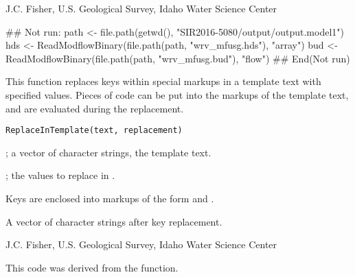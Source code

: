 \documentclass[a4paper]{book}
\begin{document}
%
\begin{Author}\relax
J.C. Fisher, U.S. Geological Survey, Idaho Water Science Center
\end{Author}
%
\begin{SeeAlso}\relax
{}
\end{SeeAlso}
%
\begin{Examples}
\begin{ExampleCode}
## Not run: 
path <- file.path(getwd(), "SIR2016-5080/output/output.model1")
hds <- ReadModflowBinary(file.path(path, "wrv_mfusg.hds"), "array")
bud <- ReadModflowBinary(file.path(path, "wrv_mfusg.bud"), "flow")
## End(Not run)
\end{ExampleCode}
\end{Examples}
%
\begin{Description}\relax
This function replaces keys within special markups in a template text with specified values.
Pieces of \R{} code can be put into the markups of the template text, and are evaluated during the replacement.
\end{Description}
%
\begin{Usage}
\begin{verbatim}
ReplaceInTemplate(text, replacement)
\end{verbatim}
\end{Usage}
%
\begin{Arguments}
\begin{ldescription}
\item[\code{text}] ; a vector of character strings, the template text.
\item[\code{replacement}] ; the values to replace in .
\end{ldescription}
\end{Arguments}
%
\begin{Details}\relax
Keys are enclosed into markups of the form  and .
\end{Details}
%
\begin{Value}
A vector of character strings after key replacement.
\end{Value}
%
\begin{Author}\relax
J.C. Fisher, U.S. Geological Survey, Idaho Water Science Center
\end{Author}
%
\begin{References}\relax
This code was derived from the  function.
\end{References}
\end{document}
